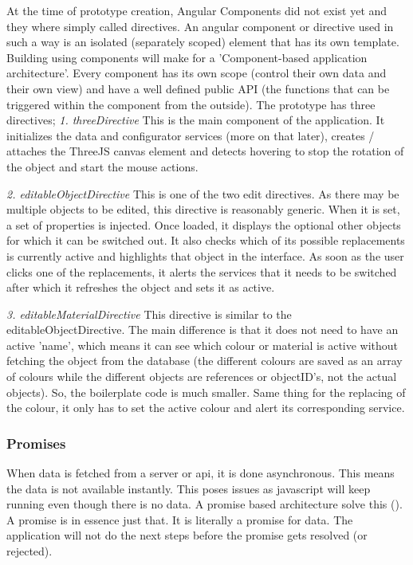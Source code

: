 At the time of prototype creation, Angular Components did not exist yet and they where simply called directives. An angular component or directive used in such a way is an isolated (separately scoped) element that has its own template. Building using components will make for a 'Component-based application architecture'. Every component has its own scope (control their own data and their own view) and have a well defined public API (the functions that can be triggered within the component from the outside). 
The prototype has three directives;
\newline
\textit{1. threeDirective} \newline
This is the main component of the application. It initializes the data and configurator services (more on that later), creates / attaches the ThreeJS canvas element and detects hovering to stop the rotation of the object and start the mouse actions.

\textit{2. editableObjectDirective} \newline
This is one of the two edit directives. As there may be multiple objects to be edited, this directive is reasonably generic. When it is set, a set of properties is injected. Once loaded, it displays the optional other objects for which it can be switched out. It also checks which of its possible replacements is currently active and highlights that object in the interface. As soon as the user clicks one of the replacements, it alerts the services that it needs to be switched after which it refreshes the object and sets it as active.

\textit{3. editableMaterialDirective} \newline
This directive is similar to the editableObjectDirective. The main difference is that it does not need to have an active 'name', which means it can see which colour or material is active without fetching the object from the database (the different colours are saved as an array of colours while the different objects are references or objectID's, not the actual objects). So, the boilerplate code is much smaller. Same thing for the replacing of the colour, it only has to set the active colour and alert its corresponding service.

\subsubsection{Promises}
When data is fetched from a server or api, it is done asynchronous. This means the data is not available instantly. This poses issues as javascript will keep running even though there is no data. A promise based architecture solve this (\cite{promiseBasedArchitecture}). A promise is in essence just that. It is literally a promise for data. The application will not do the next steps before the promise gets resolved (or rejected).

